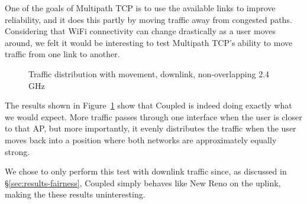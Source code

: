 One of the goals of Multipath TCP is to use the available links to improve
reliability, and it does this partly by moving traffic away from congested
paths. Considering that WiFi connectivity can change drastically as a user moves around,
we felt it would be interesting to test Multipath TCP's ability to move traffic
from one link to another.

\begin{figure}[h]
 \centering
 
 \caption{Traffic distribution with movement, downlink, non-overlapping 2.4 GHz}\label{graph:mobility}
\end{figure}

The results shown in
Figure~\ref{graph:mobility} show that Coupled is indeed doing exactly what
we would expect. More traffic passes through one interface when the user is
closer to that AP, but more importantly, it evenly distributes the
traffic when the user moves back into a position where both networks are
approximately equally strong.

We chose to only perform this test with downlink traffic since, as discussed in
\S\ref{sec:results-fairness}, Coupled simply behaves like New Reno on the uplink,
making the these results uninteresting.

